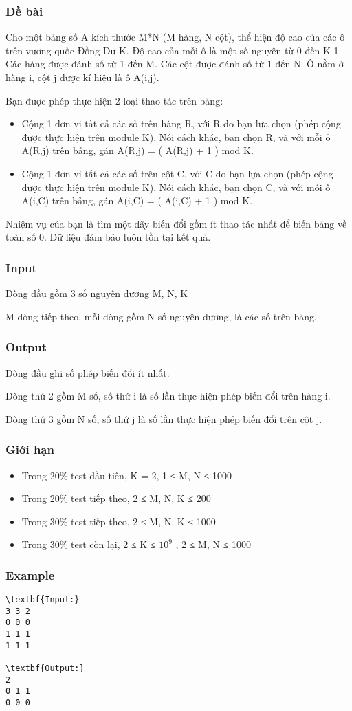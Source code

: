 \subsubsection{Đề bài}

Cho một bảng số A kích thước M*N (M hàng, N cột), thể hiện độ cao của các ô trên vương quốc Đồng Dư K. Độ cao của mỗi ô là một số nguyên từ 0 đến K-1. Các hàng được đánh số từ 1 đến M. Các cột được đánh số từ 1 đến N. Ô nằm ở hàng i, cột j được kí hiệu là ô A(i,j).

Bạn được phép thực hiện 2 loại thao tác trên bảng:
\begin{itemize}
	\item Cộng 1 đơn vị tất cả các số trên hàng R, với R do bạn lựa chọn (phép cộng được thực hiện trên module K). Nói cách khác, bạn chọn R, và với mỗi ô A(R,j) trên bảng, gán A(R,j) = ( A(R,j) + 1 ) mod K.
	\item Cộng 1 đơn vị tất cả các số trên cột C, với C do bạn lựa chọn (phép cộng được thực hiện trên module K). Nói cách khác, bạn chọn C, và với mỗi ô A(i,C) trên bảng, gán A(i,C) = ( A(i,C) + 1 ) mod K.
\end{itemize}

Nhiệm vụ của bạn là tìm một dãy biến đổi gồm ít thao tác nhất để biến bảng về toàn số 0. Dữ liệu đảm bảo luôn tồn tại kết quả.

\subsubsection{Input}

Dòng đầu gồm 3 số nguyên dương M, N, K

M dòng tiếp theo, mỗi dòng gồm N số nguyên dương, là các số trên bảng.

\subsubsection{Output}

Dòng đầu ghi số phép biến đổi ít nhất.

Dòng thứ 2 gồm M số, số thứ i là số lần thực hiện phép biến đổi trên hàng i.

Dòng thứ 3 gồm N số, số thứ j là số lần thực hiện phép biến đổi trên cột j.

\subsubsection{Giới hạn}
\begin{itemize}
	\item Trong 20\% test đầu tiên, K = 2, 1 ≤ M, N ≤ 1000
	\item Trong 20\% test tiếp theo, 2 ≤ M, N, K ≤ 200
	\item Trong 30\% test tiếp theo, 2 ≤ M, N, K ≤ 1000
	\item Trong 30\% test còn lại, 2 ≤ K ≤ $10^{9}$ , 2 ≤ M, N ≤ 1000
\end{itemize}

\subsubsection{Example}
\begin{verbatim}
\textbf{Input:}
3 3 2
0 0 0
1 1 1
1 1 1

\textbf{Output:}
2
0 1 1
0 0 0\end{verbatim}
